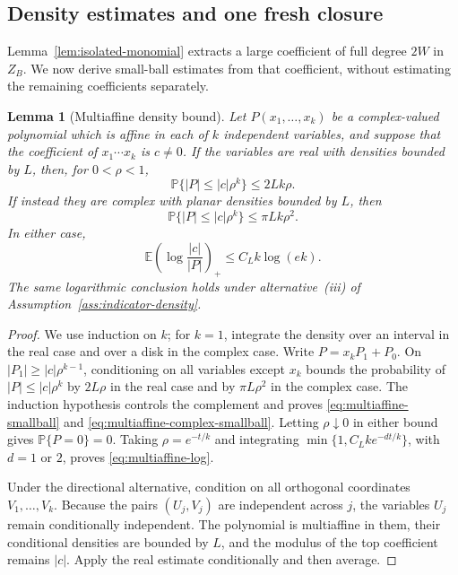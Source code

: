 \documentclass[11pt,reqno]{amsart}
\numberwithin{equation}{section}
\newtheorem{lemma}[theorem]{Lemma}
\theoremstyle{definition}
\theoremstyle{remark}
\newcommand{\E}{\mathbb E}
\newcommand{\Pp}{\mathbb P}
\newcommand{\1}{\mathbf 1}
\begin{document}
\subsection{Density estimates and one fresh closure}
\label{sec:density-scan}
Lemma~\ref{lem:isolated-monomial} extracts a large coefficient of full degree
$2W$ in $Z_B$.  We now derive small-ball estimates from that coefficient,
without estimating the remaining coefficients separately.
\begin{lemma}[Multiaffine density bound]\label{lem:multiaffine}
Let $P(x_1,\ldots,x_k)$ be a complex-valued polynomial which is affine in
each of $k$ independent variables, and suppose that the coefficient of
$x_1\cdots x_k$ is $c\ne0$.  If the variables are real with densities
bounded by $L$, then, for $0<\rho<1$,
\begin{equation}\label{eq:multiaffine-smallball}
 \Pp\{|P|\le |c|\rho^k\}\le 2Lk\rho.
\end{equation}
If instead they are complex with planar densities bounded by $L$, then
\begin{equation}\label{eq:multiaffine-complex-smallball}
 \Pp\{|P|\le |c|\rho^k\}\le \pi Lk\rho^2.
\end{equation}
In either case,
\begin{equation}\label{eq:multiaffine-log}
 \E\left(\log\frac{|c|}{|P|}\right)_+
 \le C_L k\log(ek).
\end{equation}
The same logarithmic conclusion holds under alternative~\textnormal{(iii)}
of Assumption~\ref{ass:indicator-density}.
\end{lemma}

\begin{proof}
We use induction on $k$; for $k=1$, integrate the density over an interval
in the real case and over a disk in the complex case.  Write
$P=x_kP_1+P_0$.  On $|P_1|\ge|c|\rho^{k-1}$, conditioning on all variables
except $x_k$ bounds the probability of $|P|\le|c|\rho^k$ by $2L\rho$ in
the real case and by $\pi L\rho^2$ in the complex case.  The induction
hypothesis controls the complement and proves
\eqref{eq:multiaffine-smallball} and
\eqref{eq:multiaffine-complex-smallball}.  Letting $\rho\downarrow0$ in
either bound gives $\Pp\{P=0\}=0$.  Taking $\rho=e^{-t/k}$ and
integrating $\min\{1,C_Lke^{-dt/k}\}$, with $d=1$ or $2$, proves
\eqref{eq:multiaffine-log}.

Under the directional alternative, condition on all orthogonal
coordinates $V_1,\ldots,V_k$.  Because the pairs $(U_j,V_j)$ are
independent across $j$, the variables $U_j$ remain conditionally
independent.  The polynomial is multiaffine in them, their conditional
densities are bounded by $L$, and the modulus of the top coefficient remains
$|c|$.  Apply the real estimate conditionally and then average.
\end{proof}
\end{document}
